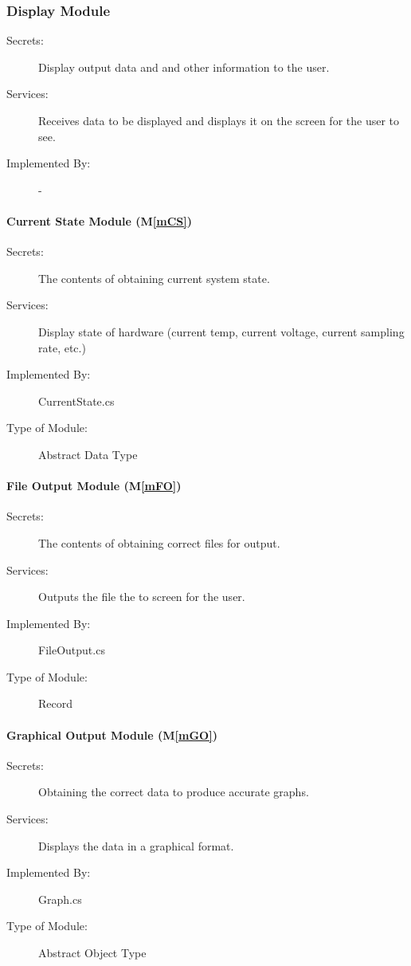 \documentclass[12pt, titlepage]{article}
\newcommand{\mref}[1]{M\ref{#1}}
\begin{document}
\subsubsection{Display Module}
\begin{description}
  \item[Secrets:] Display output data and and other information to the user.
  \item[Services:]Receives data to be displayed and displays it on the screen for the user to see. 
  \item[Implemented By:] -
\end{description}

\paragraph{Current State Module (\mref{mCS})}
\begin{description}
\item[Secrets:]The contents of obtaining current system state.
\item[Services:]Display state of hardware (current temp, current voltage, current sampling rate, etc.)
\item[Implemented By:] CurrentState.cs
\item[Type of Module:] Abstract Data Type
\end{description}

\paragraph{File Output Module (\mref{mFO})}
\begin{description}
\item[Secrets:]The contents of obtaining correct files for output.
\item[Services:]Outputs the file the to screen for the user. 
\item[Implemented By:] FileOutput.cs
\item[Type of Module:] Record
\end{description}
\paragraph{Graphical Output Module (\mref{mGO})}
\begin{description}
\item[Secrets:]Obtaining the correct data to produce accurate graphs.
\item[Services:]Displays the data in a graphical format. 
\item[Implemented By:] Graph.cs
\item[Type of Module:] Abstract Object Type
\end{description}
\end{document}
